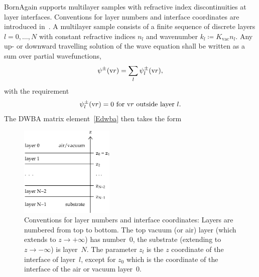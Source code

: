 BornAgain supports multilayer samples
with refractive index discontinuities at layer interfaces.
Conventions for layer numbers and interface coordinates are
introduced in~.
A multilayer sample consists of a finite sequence of discrete layers
$l=0,\ldots,N$
%
with constant refractive indices $n_l$
%
%
and wavenumber $k_l\coloneqq K_\text{vac} n_l$.
Any up- or downward travelling solution of the wave equation shall be written
as a sum over partial wavefunctions,
\begin{equation}\label{Epsipmsuml}
  \psi^\pm(\text{v}{r}) = \sum_l \psi_l^\pm(\text{v}{r}),
\end{equation}
with the requirement
\begin{equation}\label{Epsipmloutside}
   \psi_l^\pm(\text{v}{r}) = 0 \text{~for $\text{v}{r}$ outside layer~$l$.}
\end{equation}
The DWBA matrix element~\cref{Edwba} then takes the form

\begin{figure}[tb]
\begin{center}
\includegraphics[width=0.4\textwidth]{fig/drawing/multilayer_z_conventions.ps}
\end{center}
\caption{Conventions for layer numbers and interface coordinates:
Layers are numbered from top to bottom.
The top vacuum (or air) layer (which extends to $z\to+\infty$) has number~0,
the substrate (extending to $z\to-\infty$) is layer~$N$.
%
%
%
The parameter $z_l$
%
is the $z$ coordinate of the  interface of layer~$l$,
%
%
%
except for $z_0$ which is the coordinate of the  interface
of the air or vacuum layer~0.}
\label{Fdefz}
\end{figure}

